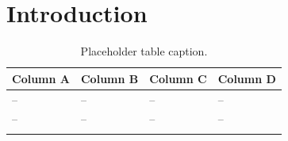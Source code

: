 \documentclass[pdflatex,sn-mathphys-num]{sn-jnl}
\begin{document}
\title[]{}

\author*[1]{\fnm{} \sur{}}\email{}

\affil*[1]{\orgdiv{}, \orgname{}, \orgaddress{\street{}, \city{}, \postcode{}, \state{}, \country{}}}

\abstract{}

\keywords{}

\maketitle

\section{Introduction}\label{sec:intro}

\begin{table}[H]
\caption{Placeholder table caption.}\label{tab:placeholder}%
\begin{tabular}{@{}llll@{}}
\toprule
Column A & Column B & Column C & Column D \\
\midrule
-- & -- & -- & -- \\
-- & -- & -- & -- \\
\botrule
\end{tabular}
\end{table}
\end{document}
